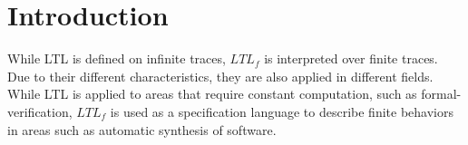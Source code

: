 \section{Introduction}

While LTL is defined on infinite traces, $LTL_f$ is interpreted over finite traces. Due to their different characteristics, they are also applied in different fields. While LTL is applied to areas that require constant computation, such as formal-verification, $LTL_f$ is used as a specification language to describe finite behaviors in areas such as automatic synthesis of software.
